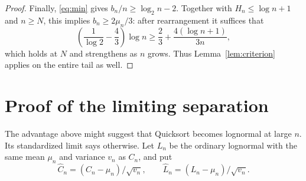 \documentclass[10pt,letterpaper]{article}
\begin{document}
\begin{proof}
Finally, \eqref{eq:min} gives $b_n/n\ge\log_2n-2$. Together with $H_n\le\log n+1$ and $n\ge N$, this implies $b_n\ge2\mu_n/3$: after rearrangement it suffices that
\begin{equation}
\left(\frac1{\log2}-\frac43\right)\log n
\ge\frac23+\frac{4(\log n+1)}{3n},                       \label{eq:minbound}
\end{equation}
which holds at $N$ and strengthens as $n$ grows. Thus Lemma~\ref{lem:criterion} applies on the entire tail as well.
\end{proof}

\section{Proof of the limiting separation}
The advantage above might suggest that Quicksort becomes lognormal at large $n$. Its standardized limit says otherwise. Let $L_n$ be the ordinary lognormal with the same mean $\mu_n$ and variance $v_n$ as $C_n$, and put
\[\widehat C_n=(C_n-\mu_n)/\sqrt{v_n},\qquad
\widehat L_n=(L_n-\mu_n)/\sqrt{v_n}.\]
\end{document}
